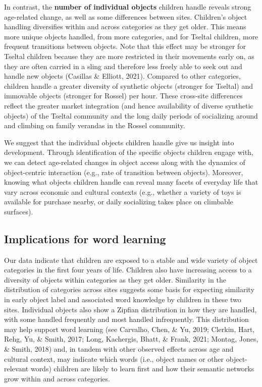 \documentclass[10pt, letterpaper]{article}
\begin{document}
In contrast, the \textbf{number of individual objects} children handle
reveals strong age-related change, as well as some differences between
sites. Children's object handling diversifies within and across
categories as they get older. This means more unique objects handled,
from more categories, and for Tseltal children, more frequent
transitions between objects. Note that this effect may be stronger for
Tseltal children because they are more restricted in their movements
early on, as they are often carried in a sling and therefore less freely
able to seek out and handle new objects (Casillas \& Elliott, 2021).
Compared to other categories, children handle a greater diversity of
synthetic objects (stronger for Tseltal) and immovable objects (stronger
for Rossel) per hour. These cross-site differences reflect the greater
market integration (and hence availability of diverse synthetic objects)
of the Tseltal community and the long daily periods of socializing
around and climbing on family verandas in the Rossel community.

We suggest that the individual objects children handle give us insight
into development. Through identification of the specific objects
children engage with, we can detect age-related changes in object access
along with the dynamics of object-centric interaction (e.g., rate of
transition between objects). Moreover, knowing what objects children
handle can reveal many facets of everyday life that vary across economic
and cultural contexts (e.g., whether a variety of toys is available for
purchase nearby, or daily socializing takes place on climbable
surfaces).

\hypertarget{implications-for-word-learning}{%
\subsection{Implications for word
learning}\label{implications-for-word-learning}}

Our data indicate that children are exposed to a stable and wide variety
of object categories in the first four years of life. Children also have
increasing access to a diversity of objects within categories as they
get older. Similarity in the distribution of categories across sites
suggests some basis for expecting similarity in early object label and
associated word knowledge by children in these two sites. Individual
objects also show a Zipfian distribution in how they are handled, with
some handled frequently and most handled infrequently. This distribution
may help support word learning (see Carvalho, Chen, \& Yu, 2019;
Clerkin, Hart, Rehg, Yu, \& Smith, 2017; Long, Kachergis, Bhatt, \&
Frank, 2021; Montag, Jones, \& Smith, 2018) and, in tandem with other
observed effects across age and cultural context, may indicate which
words (i.e., object names or other object-relevant words) children are
likely to learn first and how their semantic networks grow within and
across categories.
\end{document}
